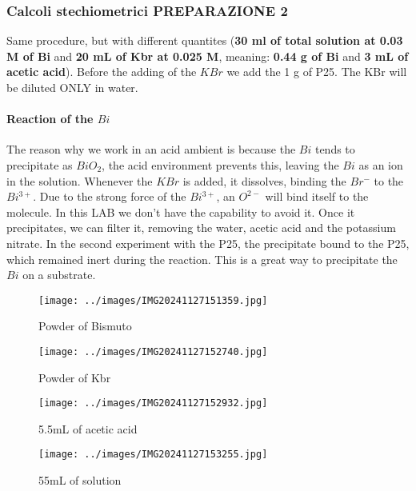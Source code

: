 \subsubsection{Calcoli stechiometrici PREPARAZIONE 2}

Same procedure, but with different quantites (\textbf{30 ml of total solution at 0.03 M of Bi} and \textbf{20 mL of Kbr at 0.025 M}, meaning: \textbf{0.44 g of Bi} and \textbf{3 mL of acetic acid}). Before the adding of the $KBr$ we add the 1 g of P25. The KBr will be diluted ONLY in water.

\paragraph{Reaction of the $Bi$} The reason why we work in an acid ambient is because the $Bi$ tends to precipitate as $BiO_2$, the acid environment prevents this, leaving the $Bi$ as an ion in the solution. Whenever the $KBr$ is added, it dissolves, binding the $Br^-$ to the $Bi^{3+}$. Due to the strong force of the $Bi^{3+}$, an $O^{2-}$ will bind itself to the molecule. In this LAB we don't have the capability to avoid it. Once it precipitates, we can filter it, removing the water, acetic acid and the potassium nitrate. In the second experiment with the P25, the precipitate bound to the P25, which remained inert during the reaction. This is a great way to precipitate the $Bi$ on a substrate.


\begin{figure}[ht]
    \centering
	\texttt{[image: ../images/IMG20241127151359.jpg]}
    \caption{Powder of Bismuto}
\end{figure}

\begin{figure}[ht]
    \centering
	\texttt{[image: ../images/IMG20241127152740.jpg]}
    \caption{Powder of Kbr}
\end{figure}

\begin{figure}[ht]
    \centering
	\texttt{[image: ../images/IMG20241127152932.jpg]}
    \caption{5.5mL of acetic acid}
\end{figure}

\begin{figure}[ht]
    \centering
	\texttt{[image: ../images/IMG20241127153255.jpg]}
    \caption{55mL of solution}
\end{figure}

